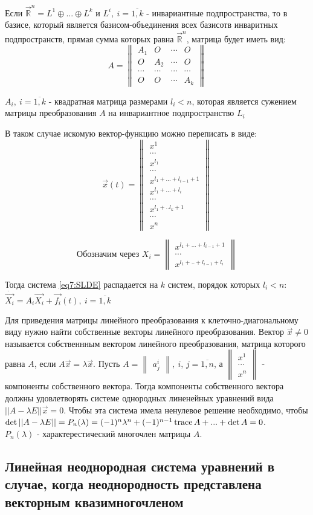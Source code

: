 Если $\vec{\mathbb{R}}^n = L^1 \oplus ... \oplus L^k$ и $L^i, ~i = \overline{1, k}$ - инвариантные подпространства, то в базисе, который является базисом-объединения всех базисотв инваритных подпространств, прямая сумма которых равна $\vec{\mathbb{R}}^n$, матрица будет иметь вид:
\[A = \begin{Vmatrix} A_1 & O & \cdots & O \\ O & A_2 & \cdots & O \\ \cdots & \cdots & \cdots & \cdots \\ O & O &\cdots & A_k \end{Vmatrix} \] 

$A_i, ~i = \overline{1, k}$ - квадратная матрица размерами $l_i < n$, которая является сужением матрицы преобразования $A$ на инвариантное подпространство $L_i$

В таком случае искомую вектор-функцию можно переписать в виде: 
\[ \vec{x}(t) = \begin{Vmatrix} x^1 \\ \cdots \\ x^{l_1} \\ \cdots \\ x^{l_1 + ... + l_{i-1} + 1} \\ x^{l_1 + ... + l_{i}} \\ \cdots \\ x^{l_1 + .. l_k + 1} \\ \cdots \\ x^n \end{Vmatrix}\]

\[\text{Обозначим через } X_i = \begin{Vmatrix} x^{l_1 + ... + l_{i-1} + 1} \\ \cdots \\ x^{l_1 + .. + l_{i-1} + l_{i}}\end{Vmatrix} \]

Тогда система \eqref{eq7:SLDE} распадается на $k$ систем, порядок которых $l_i < n$: \\
$\dot{\vec{X_i}} = A_i \vec{X_i} + \vec{f_i}(t), ~i =\overline{1, k}$

Для приведения матрицы линейного преобразования к клеточно-диагональному виду нужно найти собственные векторы линейного преобразования. 
Вектор $\vec{x} \neq 0$ называется собственнным вектором линейного преобразования, матрица которого равна $A$, если $A\vec{x} = \lambda \vec{x}$. 
Пусть $A = \begin{Vmatrix} a_j^i \end{Vmatrix}, ~i,\,j = \overline{1, n}$, а $\begin{Vmatrix} x^1 \\ \cdots \\ x^n \end{Vmatrix}$ - компоненты собственного вектора.
Тогда компоненты собственного вектора должны удовлетворять системе однородных линенейных уравнений вида $|| A - \lambda E|| \vec{x} = 0$. 
Чтобы эта система имела ненулевое решение необходимо, чтобы $\det || A - \lambda E|| = P_n(\lambda) = (-1)^n \lambda^n + (-1)^{n-1} \operatorname{trace} A + ... + \det A = 0$. \\
$P_n(\lambda)$ - характерестический многочлен матрицы $A$. 
\subsection{Линейная неоднородная система уравнений в случае, когда неоднородность представлена векторным квазимногочленом}

